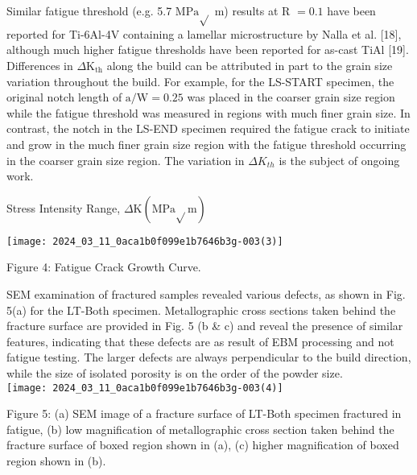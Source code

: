 \documentclass[10pt]{article}
\begin{document}
Similar fatigue threshold (e.g. 5.7 $\mathrm{MPa} \sqrt{ }$ m) results at $\mathrm{R}$ $=0.1$ have been reported for Ti-6Al-4V containing a lamellar microstructure by Nalla et al. [18], although much higher fatigue thresholds have been reported for as-cast TiAl [19]. Differences in $\Delta \mathrm{K}_{\mathrm{th}}$ along the build can be attributed in part to the grain size variation throughout the build. For example, for the LS-START specimen, the original notch length of $\mathrm{a} / \mathrm{W}=0.25$ was placed in the coarser grain size region while the fatigue threshold was measured in regions with much finer grain size. In contrast, the notch in the LS-END specimen required the fatigue crack to initiate and grow in the much finer grain size region with the fatigue threshold occurring in the coarser grain size region. The variation in $\Delta K_{t h}$ is the subject of ongoing work.

Stress Intensity Range, $\Delta \mathrm{K}(\mathrm{MPa} \sqrt{ } \mathrm{m})$

\begin{center}
\texttt{[image: 2024\_03\_11\_0aca1b0f099e1b7646b3g-003(3)]}
\end{center}

Figure 4: Fatigue Crack Growth Curve.

SEM examination of fractured samples revealed various defects, as shown in Fig. 5(a) for the LT-Both specimen. Metallographic cross sections taken behind the fracture surface are provided in Fig. 5 (b \& c) and reveal the presence of similar features, indicating that these defects are as result of EBM processing and not fatigue testing. The larger defects are always perpendicular to the build direction, while the size of isolated porosity is on the order of the powder size.\\
\texttt{[image: 2024\_03\_11\_0aca1b0f099e1b7646b3g-003(4)]}

Figure 5: (a) SEM image of a fracture surface of LT-Both specimen fractured in fatigue, (b) low magnification of metallographic cross section taken behind the fracture surface of boxed region shown in (a), (c) higher magnification of boxed region shown in (b).
\end{document}
